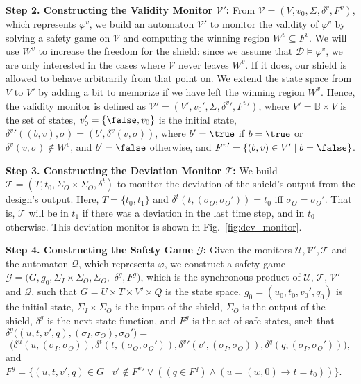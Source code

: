 \documentclass{llncs}
\newcommand{\B}{\mathbb{B}}
\newcommand{\design}{\mathcal{D}}
\newcommand{\dinalph}{\Sigma_I}
\newcommand{\dinletter}{{\sigma_I}}
\newcommand{\doutalph}{\Sigma_O}
\newcommand{\doutletter}{{\sigma_O}}
\newcommand{\dalph}{\Sigma}
\newcommand{\dletter}{\sigma}
\newcommand{\spec}{\varphi}
\newcommand{\specv}{\varphi^v}
\begin{document}
\noindent
\textbf{Step 2. Constructing the Validity Monitor $\mathcal{V'}$:}
From $\mathcal{V}= (V, v_{0}, \dalph, \delta^v, F^v)$, which represents 
$\specv$, we build an automaton $\mathcal{V'}$ to monitor the validity 
of $\specv$ by solving a safety game on $\mathcal{V}$ and computing the 
winning region $W^v\subseteq F^v$. We will use $W^v$ to increase the 
freedom for the shield: since we assume that 
$\design\models\specv$, we are only interested in the cases where 
$\mathcal{V}$ never leaves $W^v$.  If it does, our shield is 
allowed to behave arbitrarily from that point on.  
We extend the state space from $V$ to $V'$ by adding a bit to 
memorize if we have left the winning region $W^v$.  Hence, the 
validity monitor is defined as $\mathcal{V}' = (V', v_{0}', \dalph, 
{\delta^v}', {F^v}')$, where $V' = \B \times V$ is the set of states, 
$v_{0}' = \{\false, v_0\}$ is the initial state, 
${\delta^v}'((b,v),\dletter) = (b', \delta^v(v,\dletter))$, where 
$b'=\true$ if $b=\true$ or $\delta^v(v,\dletter) \not \in W^v$, and 
$b'=\false$ otherwise, and  ${F^v}' = \{(b,v) \in V' \mid b=\false\}$.

\noindent
\textbf{Step 3. Constructing the Deviation Monitor $\mathcal{T}$:}
We build $\mathcal{T} = (T, t_0, \doutalph \times \doutalph, \delta^t)$ 
to monitor the deviation of the shield's output from the design's 
output. Here, $T = \{t_0, t_1\}$ and $\delta^t(t, (\doutletter, 
\doutletter')) = t_0$ iff $\doutletter = \doutletter'$. That is, 
$\mathcal{T}$ will be in $t_1$ if there was a deviation in the last time 
step, and in $t_0$ otherwise.  This deviation monitor is shown in 
Fig.~\ref{fig:dev_monitor}.

\noindent
\textbf{Step 4. Constructing the Safety Game $\mathcal{G}$:}
Given the monitors $\mathcal{U},\mathcal{V'},\mathcal{T}$ and the 
automaton $\mathcal{Q}$, which represents $\spec$, we construct a safety 
game $\mathcal{G} = (G, g_0, \dinalph \times \doutalph, \doutalph, $ 
$\delta^g, F^g)$, which is the synchronous product of $\mathcal{U}$, 
$\mathcal{T}$, $\mathcal{V}'$ and $\mathcal{Q}$, such that $G= U \times 
T \times V' \times Q$ is the state space, $g_0 = (u_0, t_0, v_0', q_0)$ 
is the initial state, $\dinalph\times\doutalph$ is the input of the 
shield, $\doutalph$ is the output of the shield, $\delta^g$ is the 
next-state function, and $F^g$ is the set of safe states, such that
$\delta^g\bigl((u, t, v', q), (\dinletter, \doutletter), 
\doutletter'\bigr) = $
\[
\bigl( \delta^u(u,(\dinletter, \doutletter)), 
       \delta^t(t,(\doutletter, \doutletter')), 
       {\delta^v}'(v',(\dinletter, \doutletter)), 
       \delta^q(q, (\dinletter, \doutletter'))
\bigr),
\]
and $F^g = \{(u, t, v', q)\in G \mid 
             v' \not\in {F^v}' \vee 
             ((q \in F^q) \wedge (u=(w,0) \rightarrow t=t_0))
           \}$.
\end{document}
